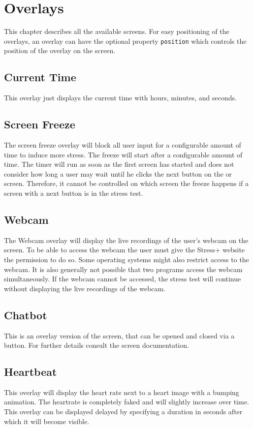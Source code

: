\section{Overlays}
\label{sec:overlays}

This chapter describes all the available screens.
For easy positioning of the overlays, an overlay can have the optional property \texttt{position} which controls the position of the overlay on the screen.

\subsection{Current Time}
\label{sec:overlays-current-time}
This overlay just displays the current time with hours, minutes, and seconds.

\subsection{Screen Freeze}
\label{sec:overlays-screen-freeze}
The screen freeze overlay will block all user input for a configurable amount of time to induce more stress.
The freeze will start after a configurable amount of time.
The timer will run as soon as the first screen has started and does not consider how long a user may wait until he clicks the next button on the  or  screen.
Therefore, it cannot be controlled on which screen the freeze happens if a screen with a next button is in the stress test.

\subsection{Webcam}
\label{sec:overlays-webcam}
The Webcam overlay will display the live recordings of the user's webcam on the screen.
To be able to access the webcam the user must give the Stress+ website the permission to do so.
Some operating systems might also restrict access to the webcam.
It is also generally not possible that two programs access the webcam simultaneously.
If the webcam cannot be accessed, the stress test will continue without displaying the live recordings of the webcam.

\subsection{Chatbot}
\label{sec:overlays-chatbot}
This is an overlay version of the  screen, that can be opened and closed via a button.
For further details consult the  screen documentation.


\subsection{Heartbeat}
\label{sec:overlays-heartbeat}
This overlay will display the heart rate next to a heart image with a bumping animation.
The heartrate is completely faked and will slightly increase over time.
This overlay can be displayed delayed by specifying a duration in seconds after which it will become visible.
